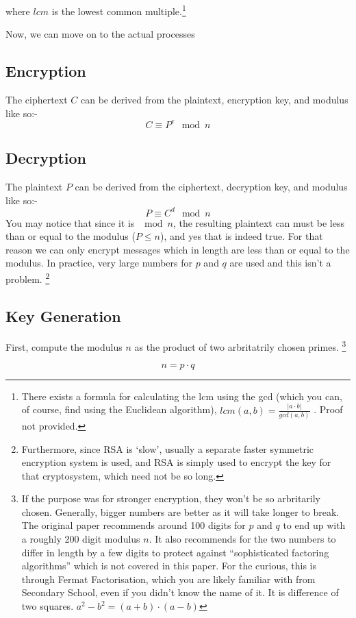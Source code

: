 \documentclass[twocolumn, a4paper,12pt]{article}
\let\modcong\equiv
\begin{document}
where $lcm$ is the lowest common multiple.\footnote{There exists
a formula for calculating the lcm using the gcd (which you can, of course,
find using the Euclidean algorithm), $lcm(a,b) = 
\frac{|a \cdot b|}{gcd(a,b)}$ . Proof not provided.}

Now, we can move on to the actual processes
\subsection{Encryption}
The ciphertext $C$ can be derived from the plaintext, encryption key, and modulus like so:-
\[ C \modcong P^e \mod n \]

\subsection{Decryption}
The plaintext $P$ can be derived from the ciphertext, decryption key, and modulus like so:-
\[ P \modcong C^d \mod n  \]
You may notice that since it is $\mod n$, the resulting plaintext can must be less than or
equal to the modulus ($P \leqslant n$), and yes that is indeed true. For that reason
we can only encrypt messages which in length are less than or equal to the modulus. In
practice, very large numbers for $p$ and $q$ are used and this isn't a problem.
\footnote{Furthermore, since RSA is `slow', usually a separate faster
symmetric encryption system is used, and RSA is simply used to encrypt the key for
that cryptosystem, which need not be so long.}

\subsection{Key Generation}
First, compute the modulus $n$ as the product of two arbritatrily chosen primes.
\footnote{If the purpose was for stronger encryption, they won't be so arbritarily chosen.
Generally, bigger numbers are better as it will take longer to break. The original 
paper \cite{Rivest1978} recommends around 100 digits for $p$ and $q$ to end up with 
a roughly 200 digit modulus $n$. It also recommends for the two numbers to 
differ in length by a few digits to protect against ``sophisticated factoring algorithms''
which is not covered in this paper. For the curious, this is through Fermat Factorisation,
which you are likely familiar with from Secondary School, even if you didn't know the name
of it. It is difference of two squares. $a^{2} - b^{2} = (a+b) \cdot (a-b)$}

\[ n = p \cdot q \]
\end{document}
